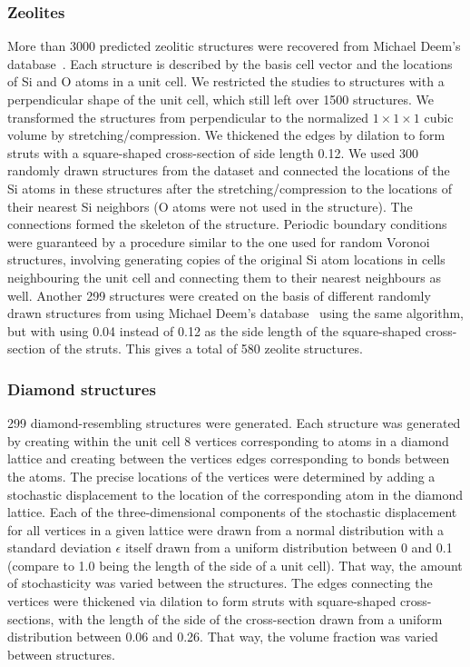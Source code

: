 \subsubsection{Zeolites}\label{sec:zeolites}

More than 3000 predicted zeolitic structures were recovered from Michael Deem's database~\cite{C0CP02255A, deem2023pcod}. Each structure is described by the basis cell vector and the locations of Si and O atoms in a unit cell. We restricted the studies to structures with a perpendicular shape of the unit cell, which still left over 1500 structures. We transformed the structures from perpendicular to the normalized $1\times1\times1$ cubic volume by stretching/compression. We thickened the edges by dilation to form struts with a square-shaped cross-section of side length 0.12. We used 300 randomly drawn structures from the dataset and connected the locations of the Si atoms in these structures after the stretching/compression to the locations of their nearest Si neighbors (O atoms were not used in the structure). The connections formed the skeleton of the structure. Periodic boundary conditions were guaranteed by a procedure similar to the one used for random Voronoi structures, involving generating copies of the original Si atom locations in cells neighbouring the unit cell and connecting them to their nearest neighbours as well. Another 299 structures were created on the basis of different randomly drawn structures from using Michael Deem's database~\cite{C0CP02255A, deem2023pcod} using the same algorithm, but with using 0.04 instead of 0.12 as the side length of the square-shaped cross-section of the struts.  
This gives a total of 580 zeolite structures.  %

\subsubsection{Diamond structures}

299 diamond-resembling structures were generated. Each structure was generated by creating within the unit cell 8 vertices corresponding to atoms in a diamond lattice and creating between the vertices edges corresponding to bonds between the atoms. The precise locations of the vertices were determined by adding a stochastic displacement to the location of the corresponding atom in the diamond lattice. Each of the three-dimensional components of the stochastic displacement for all vertices in a given lattice were drawn from a normal distribution with a standard deviation $\epsilon$ itself drawn from a uniform distribution between 0 and 0.1 (compare to 1.0 being the length of the side of a unit cell). That way, the amount of stochasticity was varied between the structures. The edges connecting the vertices were thickened via dilation to form struts with square-shaped cross-sections, with the length of the side of the cross-section drawn from a uniform distribution between 0.06 and 0.26. That way, the volume fraction was varied between structures.

